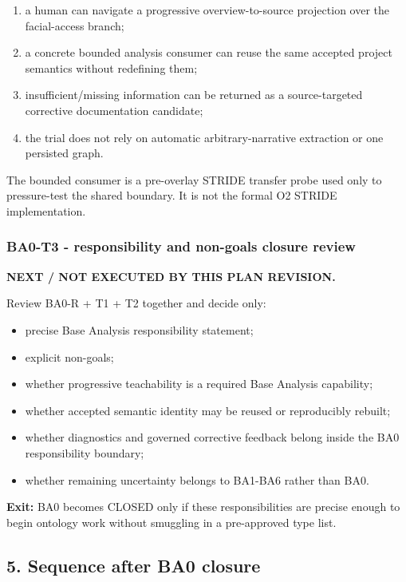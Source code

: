 \documentclass[
  10pt,
  a4paper,
]{article}
\providecommand{\tightlist}{%
  \setlength{\itemsep}{0pt}\setlength{\parskip}{0pt}}
\begin{document}
\begin{enumerate}
\def\labelenumi{\arabic{enumi}.}
\tightlist
\item
  a human can navigate a progressive overview-to-source projection over
  the facial-access branch;
\item
  a concrete bounded analysis consumer can reuse the same accepted
  project semantics without redefining them;
\item
  insufficient/missing information can be returned as a source-targeted
  corrective documentation candidate;
\item
  the trial does not rely on automatic arbitrary-narrative extraction or
  one persisted graph.
\end{enumerate}

The bounded consumer is a pre-overlay STRIDE transfer probe used only to
pressure-test the shared boundary. It is not the formal O2 STRIDE
implementation.

\subsubsection{BA0-T3 - responsibility and non-goals closure
review}\label{ba0-t3---responsibility-and-non-goals-closure-review}

\textbf{NEXT / NOT EXECUTED BY THIS PLAN REVISION.}

Review BA0-R + T1 + T2 together and decide only:

\begin{itemize}
\tightlist
\item
  precise Base Analysis responsibility statement;
\item
  explicit non-goals;
\item
  whether progressive teachability is a required Base Analysis
  capability;
\item
  whether accepted semantic identity may be reused or reproducibly
  rebuilt;
\item
  whether diagnostics and governed corrective feedback belong inside the
  BA0 responsibility boundary;
\item
  whether remaining uncertainty belongs to BA1-BA6 rather than BA0.
\end{itemize}

\textbf{Exit:} BA0 becomes CLOSED only if these responsibilities are
precise enough to begin ontology work without smuggling in a
pre-approved type list.

\subsection{5. Sequence after BA0
closure}\label{5-sequence-after-ba0-closure}
\end{document}
